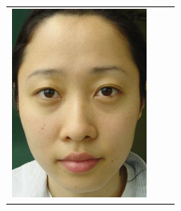 \begin{table}[H]
\begin{tabular}{|c|c|c|}
\begin{minipage}{.29\textwidth}
    \includegraphics[width=\textwidth,height=\textheight,keepaspectratio]{images/seo_target1}
  \end{minipage} & 
  \begin{minipage}{.29\textwidth}

\end{minipage}
\end{tabular}
\end{table}
